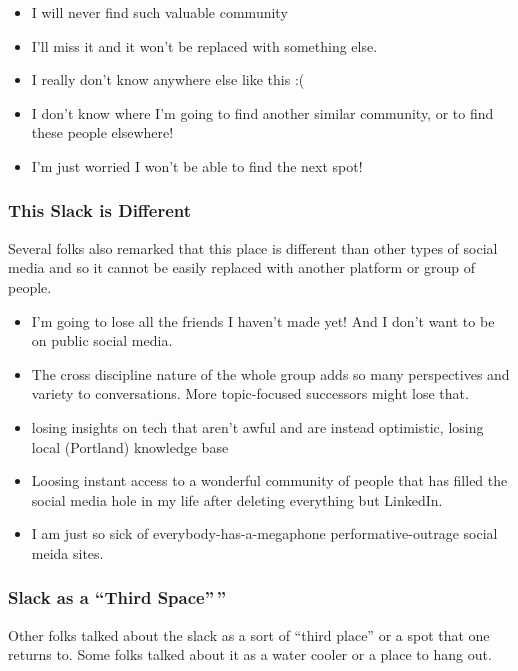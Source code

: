 \documentclass[
]{book}
\providecommand{\tightlist}{%
  \setlength{\itemsep}{0pt}\setlength{\parskip}{0pt}}
\begin{document}
\begin{itemize}
\tightlist
\item
  I will never find such valuable community
\item
  I'll miss it and it won't be replaced with something else.
\item
  I really don't know anywhere else like this :(
\item
  I don't know where I'm going to find another similar community, or to find these people elsewhere!
\item
  I'm just worried I won't be able to find the next spot!
\end{itemize}

\subsubsection{This Slack is Different}\label{this-slack-is-different}

Several folks also remarked that this place is different than other types of social media and so it cannot be easily replaced with another platform or group of people.

\begin{itemize}
\tightlist
\item
  I'm going to lose all the friends I haven't made yet! And I don't want to be on public social media.
\item
  The cross discipline nature of the whole group adds so many perspectives and variety to conversations. More topic-focused successors might lose that.
\item
  losing insights on tech that aren't awful and are instead optimistic, losing local (Portland) knowledge base
\item
  Loosing instant access to a wonderful community of people that has filled the social media hole in my life after deleting everything but LinkedIn.
\item
  I am just so sick of everybody-has-a-megaphone performative-outrage social meida sites.
\end{itemize}

\subsubsection{Slack as a ``Third Space''\,''}\label{slack-as-a-third-space}

Other folks talked about the slack as a sort of ``third place'' or a spot that one returns to. Some folks talked about it as a water cooler or a place to hang out.
\end{document}
